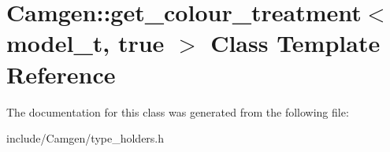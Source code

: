 \hypertarget{a00246}{}\section{Camgen\+:\+:get\+\_\+colour\+\_\+treatment$<$ model\+\_\+t, true $>$ Class Template Reference}
\label{a00246}


The documentation for this class was generated from the following file\+:\begin{DoxyCompactItemize}
\item 
include/\+Camgen/type\+\_\+holders.\+h\end{DoxyCompactItemize}
